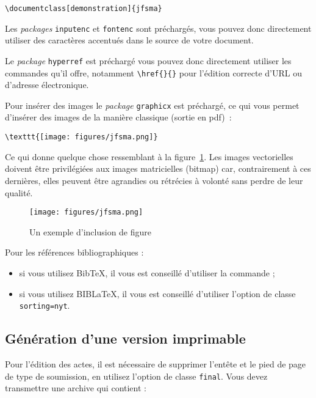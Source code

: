 \documentclass[demonstration]{jfsma}
\begin{document}
\begin{verbatim}
\documentclass[demonstration]{jfsma}
\end{verbatim}

Les \textit{packages} \texttt{inputenc} et \texttt{fontenc} sont préchargés,
vous pouvez donc directement utiliser des caractères accentués dans le source de
votre document.

Le \textit{package} \texttt{hyperref} est préchargé vous pouvez donc directement
utiliser les commandes qu'il offre, notamment \verb|\href{}{}| pour l'édition
correcte d'URL ou d'adresse électronique.

Pour insérer des images le \textit{package} \verb|graphicx| est préchargé, ce
qui vous permet d'insérer des images de la manière classique (sortie en pdf)~:
{\scriptsize%
\begin{verbatim}
\texttt{[image: figures/jfsma.png]}
\end{verbatim}
}

Ce qui donne quelque chose ressemblant à la figure~\ref{fig:maFigure}. Les images
vectorielles doivent être privilégiées aux images matricielles (bitmap) car,
contrairement à ces dernières, elles peuvent être agrandies ou rétrécies à
volonté sans perdre de leur qualité.

\newpage

\begin{figure}[hbtp]
  \centering
   \texttt{[image: figures/jfsma.png]}
  \caption{Un exemple d'inclusion de figure}
  \label{fig:maFigure}
\end{figure}

Pour les références bibliographiques :
\begin{itemize}
\item si vous utilisez Bib\TeX, il vous est conseillé d'utiliser la commande
  \verb|| ;
\item si vous utilisez BIB\LaTeX, il vous est conseillé d'utiliser l'option
  de classe \texttt{sorting=nyt}.
\end{itemize}

\subsection{Génération d'une version imprimable}

Pour l'édition des actes, il est nécessaire de supprimer l'entête et le pied de
page de type de soumission, en utilisez l'option de classe \texttt{final}.
Vous devez transmettre une archive qui contient :
\end{document}
